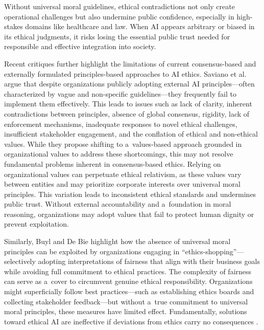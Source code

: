 \documentclass[%
  manuscript=article,
  year=2024,
  volume=77,
  doi=10.59203/zfn.77.707,
]{zfn}
\begin{document}
Without universal moral guidelines, ethical contradictions not only create operational challenges but also undermine public confidence, especially in high-stakes domains like healthcare and law. When AI appears arbitrary or biased in its ethical judgments, it risks losing the essential public trust needed for responsible and effective integration into society.



Recent critiques further highlight the limitations of current consensus-based and externally formulated principles-based approaches to AI ethics. Saviano et al. 
\parencite*[][]{saviano_reimagining_2024} %
 argue that despite organizations publicly adopting external AI principles---often characterized by vague and non-specific guidelines---they frequently fail to implement them effectively. This leads to issues such as lack of clarity, inherent contradictions between principles, absence of global consensus, rigidity, lack of enforcement mechanisms, inadequate responses to novel ethical challenges, insufficient stakeholder engagement, and the conflation of ethical and non-ethical values. While they propose shifting to a~values-based approach grounded in organizational values to address these shortcomings, this may not resolve fundamental problems inherent in consensus-based ethics. Relying on organizational values can perpetuate ethical relativism, as these values vary between entities and may prioritize corporate interests over universal moral principles. This variation leads to inconsistent ethical standards and undermines public trust. Without external accountability and a~foundation in moral reasoning, organizations may adopt values that fail to protect human dignity or prevent exploitation.



Similarly, Buyl and De Bie 
\parencite*[][]{buyl_inherent_2024} %
 highlight how the absence of universal moral principles can be exploited by organizations engaging in ``ethics-shopping''---selectively adopting interpretations of fairness that align with their business goals while avoiding full commitment to ethical practices. The complexity of fairness can serve as a~cover to circumvent genuine ethical responsibility. Organizations might superficially follow best practices---such as establishing ethics boards and collecting stakeholder feedback---but without a~true commitment to universal moral principles, these measures have limited effect. Fundamentally, solutions toward ethical AI are ineffective if deviations from ethics carry no consequences 
\parencite[][]{buyl_inherent_2024}.%
\end{document}
